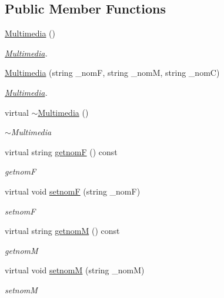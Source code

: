 \subsection*{Public Member Functions}
\begin{DoxyCompactItemize}
\item 
\hyperlink{classMultimedia_a7106753d618df92d53b89328b7ecfe7f}{Multimedia} ()
\begin{DoxyCompactList}\small\item\em \hyperlink{classMultimedia}{Multimedia}. \end{DoxyCompactList}\item 
\hyperlink{classMultimedia_a3f8beee15410ad6bbf9fa6caf0599a61}{Multimedia} (string \+\_\+nom\+F, string \+\_\+nom\+M, string \+\_\+nom\+C)
\begin{DoxyCompactList}\small\item\em \hyperlink{classMultimedia}{Multimedia}. \end{DoxyCompactList}\item 
virtual \hyperlink{classMultimedia_ab280f9ce1d0a1291c9b1ab876e854c94}{$\sim$\+Multimedia} ()
\begin{DoxyCompactList}\small\item\em $\sim$\+Multimedia \end{DoxyCompactList}\item 
virtual string \hyperlink{classMultimedia_a64cbf598c8500661be01792af535525c}{getnom\+F} () const 
\begin{DoxyCompactList}\small\item\em getnom\+F \end{DoxyCompactList}\item 
virtual void \hyperlink{classMultimedia_abc834ac0f75cf8d899912c3f72d289e0}{setnom\+F} (string \+\_\+nom\+F)
\begin{DoxyCompactList}\small\item\em setnom\+F \end{DoxyCompactList}\item 
virtual string \hyperlink{classMultimedia_a5e3458ee12aaf2b873f6ce0751c6e6a7}{getnom\+M} () const 
\begin{DoxyCompactList}\small\item\em getnom\+M \end{DoxyCompactList}\item 
virtual void \hyperlink{classMultimedia_ad06cc11ab564dcf2e819bdcca03e9439}{setnom\+M} (string \+\_\+nom\+M)
\begin{DoxyCompactList}\small\item\em setnom\+M \end{DoxyCompactList}\item 

\end{DoxyCompactItemize}

